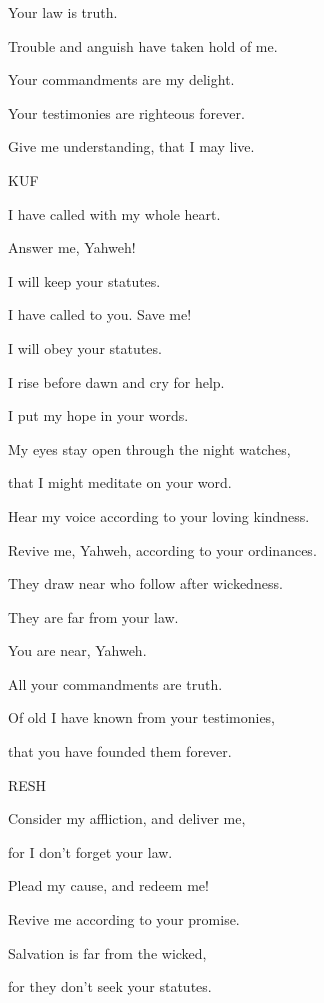 {\par }{\QB Your law is truth.
\par }{\Q {}Trouble and anguish have taken hold of me.
\par }{\QB Your commandments are my delight.
\par }{\Q {}Your testimonies are righteous forever.
\par }{\QB Give me understanding, that I may live.
\par }{\D KUF
\par }{\Q {}I have called with my whole heart.
\par }{\QB Answer me, Yahweh!
\par }{\QB I will keep your statutes.
\par }{\Q {}I have called to you. Save me!
\par }{\QB I will obey your statutes.
\par }{\Q {}I rise before dawn and cry for help.
\par }{\QB I put my hope in your words.
\par }{\Q {}My eyes stay open through the night watches,
\par }{\QB that I might meditate on your word.
\par }{\Q {}Hear my voice according to your loving kindness.
\par }{\QB Revive me, Yahweh, according to your ordinances.
\par }{\Q {}They draw near who follow after wickedness.
\par }{\QB They are far from your law.
\par }{\Q {}You are near, Yahweh.
\par }{\QB All your commandments are truth.
\par }{\Q {}Of old I have known from your testimonies,
\par }{\QB that you have founded them forever.
\par }{\D RESH
\par }{\Q {}Consider my affliction, and deliver me,
\par }{\QB for I don’t forget your law.
\par }{\Q {}Plead my cause, and redeem me!
\par }{\QB Revive me according to your promise.
\par }{\Q {}Salvation is far from the wicked,
\par }{\QB for they don’t seek your statutes.
}
